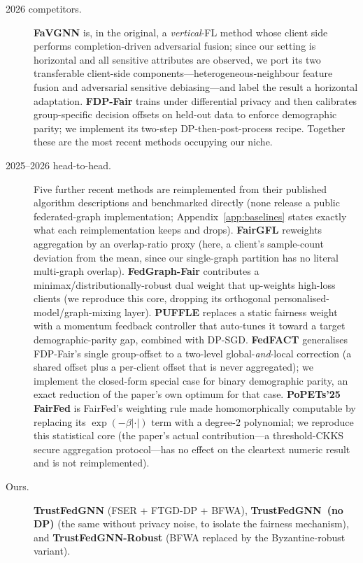 \begin{description}
\item[2026 competitors.] \textbf{FaVGNN} \cite{wang2026favgnn} is, in the
original, a \emph{vertical}-FL method whose client side performs
completion-driven adversarial fusion; since our setting is horizontal and all
sensitive attributes are observed, we port its two transferable client-side
components---heterogeneous-neighbour feature fusion and adversarial sensitive
debiasing---and label the result a horizontal adaptation. \textbf{FDP-Fair}
\cite{xue2026fdpfair} trains under differential privacy and then calibrates
group-specific decision offsets on held-out data to enforce demographic parity;
we implement its two-step DP-then-post-process recipe. Together these are the
most recent methods occupying our niche.

\item[2025--2026 head-to-head.] Five further recent methods are reimplemented
from their published algorithm descriptions and benchmarked directly (none
release a public federated-graph implementation; Appendix~\ref{app:baselines}
states exactly what each reimplementation keeps and drops). \textbf{FairGFL}
\cite{fairgfl2025} reweights aggregation by an overlap-ratio proxy (here, a
client's sample-count deviation from the mean, since our single-graph
partition has no literal multi-graph overlap). \textbf{FedGraph-Fair}
\cite{fedgraphfair2025} contributes a minimax/distributionally-robust dual
weight that up-weights high-loss clients (we reproduce this core, dropping its
orthogonal personalised-model/graph-mixing layer). \textbf{PUFFLE}
\cite{corbucci2024puffle} replaces a static fairness weight with a momentum
feedback controller that auto-tunes it toward a target demographic-parity
gap, combined with DP-SGD. \textbf{FedFACT} \cite{fedfact2025} generalises
FDP-Fair's single group-offset to a two-level global-\emph{and}-local
correction (a shared offset plus a per-client offset that is never
aggregated); we implement the closed-form special case for binary
demographic parity, an exact reduction of the paper's own optimum for that
case. \textbf{PoPETs'25 FairFed} \cite{bendoukha2025popets} is FairFed's
weighting rule made homomorphically computable by replacing its
$\exp(-\beta|\cdot|)$ term with a degree-2 polynomial; we reproduce this
statistical core (the paper's actual contribution---a threshold-CKKS secure
aggregation protocol---has no effect on the cleartext numeric result and is
not reimplemented).

\item[Ours.] \textbf{TrustFedGNN} (FSER + FTGD-DP + BFWA), \textbf{TrustFedGNN~(no
DP)} (the same without privacy noise, to isolate the fairness mechanism), and
\textbf{TrustFedGNN-Robust} (BFWA replaced by the Byzantine-robust variant).
\end{description}

